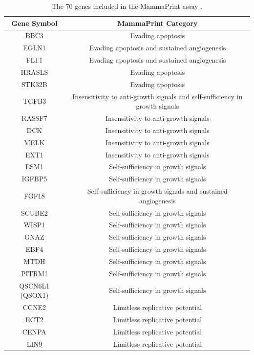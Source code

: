 {\footnotesize
\begin{longtable}[!htb]{|c|c|}
\caption{The 70 genes included in the MammaPrint assay \citep{pmid11823860, pmid21151591}.}
\label{MammaPrint_GS} \\
\hline
\textbf{Gene Symbol} & \textbf{MammaPrint Category} \\ 
\hline
BBC3 & Evading apoptosis \\
\hline
EGLN1 & Evading apoptosis and sustained angiogenesis \\
\hline
FLT1 & Evading apoptosis and sustained angiogenesis\\
\hline
HRASLS & Evading apoptosis \\
\hline
STK32B & Evading apoptosis \\
\hline
TGFB3 & Insensitivity to anti-growth signals and self-sufficiency in growth signals \\
\hline
RASSF7 & Insensitivity to anti-growth signals \\
\hline
DCK & Insensitivity to anti-growth signals \\
\hline
MELK & Insensitivity to anti-growth signals \\
\hline
EXT1 & Insensitivity to anti-growth signals \\
\hline 
ESM1 & Self-sufficiency in growth signals \\
\hline
IGFBP5 & Self-sufficiency in growth signals \\ 
\hline
FGF18 & Self-sufficiency in growth signals and sustained angiogenesis \\ 
\hline
SCUBE2 & Self-sufficiency in growth signals \\ 
\hline
WISP1 & Self-sufficiency in growth signals \\ 
\hline
GNAZ & Self-sufficiency in growth signals \\ 
\hline
EBF4 & Self-sufficiency in growth signals \\ 
\hline
MTDH & Self-sufficiency in growth signals \\ 
\hline
PITRM1 & Self-sufficiency in growth signals \\ 
\hline
QSCN6L1 (QSOX1) & Self-sufficiency in growth signals \\ 
\hline 
CCNE2 & Limitless replicative potential	\\
\hline
ECT2 & Limitless replicative potential \\  
\hline
CENPA & Limitless replicative potential \\  
\hline
LIN9 & Limitless replicative potential \\  

\end{longtable}}
